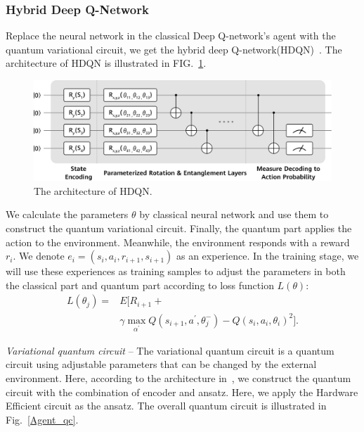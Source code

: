 \subsubsection{Hybrid Deep Q-Network}

Replace the neural network in the classical Deep Q-network's agent with the quantum variational circuit, we get the hybrid deep Q-network(HDQN)~\cite{Q_rl}. The architecture of HDQN is illustrated in FIG.~\ref{HDQN}.

\begin{figure}[ht]
    \centering
    \includegraphics[width=0.9\linewidth]{5.4.5_RL/HDQN.png}
    \caption{\label{HDQN} The architecture of HDQN.}
  \end{figure}

We calculate the parameters $\theta$ by classical neural network and use them to construct the quantum variational circuit. Finally, the quantum part applies the action to the environment. Meanwhile, the environment responds with a reward $r_i$. We denote $e_i=(s_i,a_i,r_{i+1},s_{i+1})$ as an experience. In the training stage, we will use these experiences as training samples to adjust the parameters in both the classical part and quantum part according to loss function $L(\theta)$:
\begin{equation}
\begin{split}
    L(\theta_{j})=&E[R_{i+1}+\\
    &\gamma \max_{\alpha^{'}}Q(s_{i+1},a^{'},\theta_{j}^{-})-Q(s_{i},a_{i},\theta_{i})^2].
\end{split}
\label{loss func}
\end{equation}

\textit{Variational quantum circuit} -- The variational quantum circuit is a quantum circuit using adjustable parameters that can be changed by the external environment. Here, according to the architecture in~\cite{Q_rl}, we construct the quantum circuit with the combination of encoder and ansatz. Here, we apply the Hardware Efficient circuit as the ansatz. The overall quantum circuit is illustrated in Fig.~\ref{Agent_qc}.

